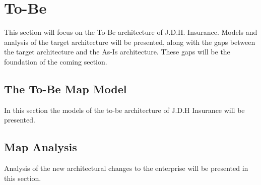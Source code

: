 \section{To-Be}
\label{sec:to_be}
This section will focus on the To-Be architecture of J.D.H. Insurance. Models and analysis of the target architecture will be presented, along with the gaps between the target architecture and the As-Is architecture. These gaps will be the foundation of the coming section.
%
\subsection{The To-Be Map Model}
\label{sec:models_to_be}
In this section the models of the to-be architecture of J.D.H Insurance will be presented.
%
\subsection{Map Analysis}
\label{sec:map_analysis_to_be}
Analysis of the new architectural changes to the enterprise will be presented in this section.
%







